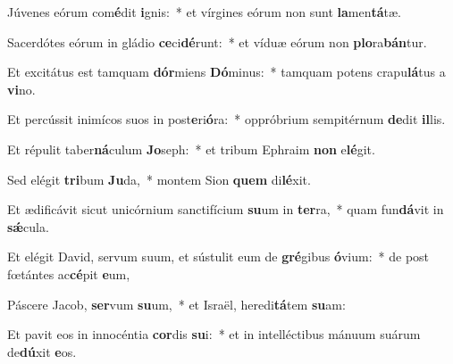 \item Júvenes eórum com\textbf{é}dit \textbf{i}gnis:~* et vírgines eórum non sunt \textbf{la}men\textbf{tá}tæ.
\item Sacerdótes eórum in gládio \textbf{ce}ci\textbf{dé}runt:~* et víduæ eórum non \textbf{plo}ra\textbf{bán}tur.
\item Et excitátus est tamquam \textbf{dór}miens \textbf{Dó}minus:~* tamquam potens crapu\textbf{lá}tus a \textbf{vi}no.
\item Et percússit inimícos suos in post\textbf{e}ri\textbf{ó}ra:~* oppróbrium sempitérnum \textbf{de}dit \textbf{il}lis.
\item Et répulit taber\textbf{ná}culum \textbf{Jo}seph:~* et tribum Ephraim \textbf{non} e\textbf{lé}git.
\item Sed elégit \textbf{tri}bum \textbf{Ju}da,~* montem Sion \textbf{quem} di\textbf{lé}xit.
\item Et ædificávit sicut unicórnium sanctifícium \textbf{su}um in \textbf{ter}ra,~* quam fun\textbf{dá}vit in \textbf{sǽ}cula.
\item Et elégit David, servum suum, et sústulit eum de \textbf{gré}gibus \textbf{ó}vium:~* de post fœtántes ac\textbf{cé}pit \textbf{e}um,
\item Páscere Jacob, \textbf{ser}vum \textbf{su}um,~* et Israël, heredi\textbf{tá}tem \textbf{su}am:
\item Et pavit eos in innocéntia \textbf{cor}dis \textbf{su}i:~* et in intelléctibus mánuum suárum de\textbf{dú}xit \textbf{e}os.
